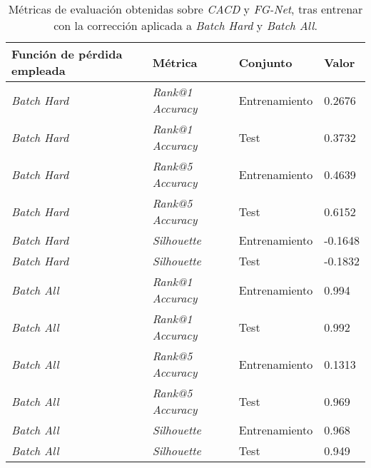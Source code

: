\begin{table}[!hbtp]
\centering
\begin{tabular}{|l|l|l|l|}
    \hline
    Función de pérdida empleada & Métrica &  Conjunto & Valor \\
    \hline

    \textit{Batch Hard} & \textit{Rank@1 Accuracy} & Entrenamiento & 0.2676 \\
    \textit{Batch Hard} & \textit{Rank@1 Accuracy} & Test  & 0.3732  \\
    \textit{Batch Hard} & \textit{Rank@5 Accuracy} & Entrenamiento & 0.4639  \\
    \textit{Batch Hard} & \textit{Rank@5 Accuracy} & Test & 0.6152 \\
    \textit{Batch Hard} & \textit{Silhouette} & Entrenamiento & -0.1648 \\
    \textit{Batch Hard} & \textit{Silhouette} & Test & -0.1832 \\

    \hline

    \textit{Batch All} & \textit{Rank@1 Accuracy} & Entrenamiento & 0.994 \\
    \textit{Batch All} & \textit{Rank@1 Accuracy} & Test & 0.992  \\
    \textit{Batch All} & \textit{Rank@5 Accuracy} & Entrenamiento & 0.1313  \\
    \textit{Batch All} & \textit{Rank@5 Accuracy} & Test & 0.969 \\
    \textit{Batch All} & \textit{Silhouette} & Entrenamiento & 0.968 \\
    \textit{Batch All} & \textit{Silhouette} & Test & 0.949 \\

    \hline

\end{tabular}
\caption{Métricas de evaluación obtenidas sobre \textit{CACD} y \textit{FG-Net}, tras entrenar con la corrección aplicada a \textit{Batch Hard} y \textit{Batch All}.}
\label{table:resultados_cacd_corregido}
\end{table}

